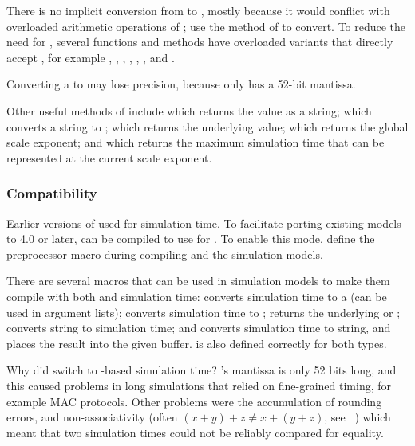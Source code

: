 There is no implicit conversion from  to , mostly
because it would conflict with overloaded arithmetic operations of ;
use the  method of  to convert. To reduce the
need for , several functions and methods have overloaded variants
that directly accept , for example , ,
, , , , and
.

\begin{note}
   Converting a  to  may lose precision, because
    only has a 52-bit mantissa.
\end{note}

Other useful methods of  include 
which returns the value as a string;  which converts a
string to ;  which returns the
underlying  value;  which returns the
global scale exponent; and  which returns the
maximum simulation time that can be represented at the current
scale exponent.

\subsubsection{Compatibility}

Earlier versions of {\opp} used  for simulation time. To facilitate
porting existing models to {\opp} 4.0 or later, {\opp} can be compiled to use
 for . To enable this mode, define the
 preprocessor macro during compiling {\opp}
and the simulation models.

There are several macros that can be used in simulation models to make
them compile with both  and  simulation time:
 converts simulation time to a 
(can be used in  argument lists);
 converts simulation time to ;
 returns the underlying  or ;
 converts string to simulation time; and
 converts simulation time to string,
and places the result into the given buffer.  is
also defined correctly for both  types.

\begin{note}
   Why did {\opp} switch to -based simulation time?
   's mantissa is only 52 bits long, and this caused
   problems in long simulations that relied on fine-grained timing,
   for example MAC protocols. Other problems were the accumulation of
   rounding errors, and non-associativity (often $(x+y)+z \neq x+(y+z)$, see
   ~\cite{Goldberg91what}) which meant that two  simulation
   times could not be reliably compared for equality.
\end{note}


